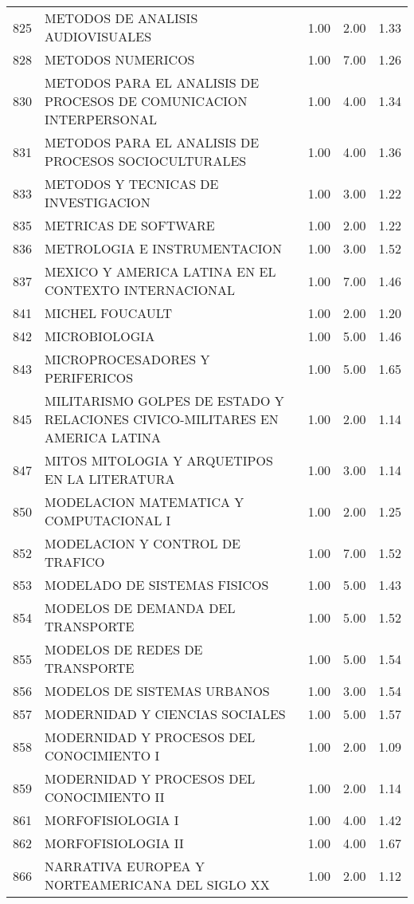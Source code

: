 \documentclass[12pt]{article}
\begin{document}
\begin{table}[ht]
\begin{tabular}{rlrrr}
  825 & METODOS DE ANALISIS AUDIOVISUALES & 1.00 & 2.00 & 1.33 \\ 
  828 & METODOS NUMERICOS & 1.00 & 7.00 & 1.26 \\ 
  830 & METODOS PARA EL ANALISIS DE PROCESOS DE COMUNICACION INTERPERSONAL & 1.00 & 4.00 & 1.34 \\ 
  831 & METODOS PARA EL ANALISIS DE PROCESOS SOCIOCULTURALES & 1.00 & 4.00 & 1.36 \\ 
  833 & METODOS Y TECNICAS DE INVESTIGACION & 1.00 & 3.00 & 1.22 \\ 
  835 & METRICAS DE SOFTWARE & 1.00 & 2.00 & 1.22 \\ 
  836 & METROLOGIA E INSTRUMENTACION & 1.00 & 3.00 & 1.52 \\ 
  837 & MEXICO Y AMERICA LATINA EN EL CONTEXTO INTERNACIONAL & 1.00 & 7.00 & 1.46 \\ 
  841 & MICHEL FOUCAULT & 1.00 & 2.00 & 1.20 \\ 
  842 & MICROBIOLOGIA & 1.00 & 5.00 & 1.46 \\ 
  843 & MICROPROCESADORES Y PERIFERICOS & 1.00 & 5.00 & 1.65 \\ 
  845 & MILITARISMO GOLPES DE ESTADO Y RELACIONES CIVICO-MILITARES EN AMERICA LATINA & 1.00 & 2.00 & 1.14 \\ 
  847 & MITOS MITOLOGIA Y ARQUETIPOS EN LA LITERATURA & 1.00 & 3.00 & 1.14 \\ 
  850 & MODELACION MATEMATICA Y COMPUTACIONAL I & 1.00 & 2.00 & 1.25 \\ 
  852 & MODELACION Y CONTROL DE TRAFICO & 1.00 & 7.00 & 1.52 \\ 
  853 & MODELADO DE SISTEMAS FISICOS & 1.00 & 5.00 & 1.43 \\ 
  854 & MODELOS DE DEMANDA DEL TRANSPORTE & 1.00 & 5.00 & 1.52 \\ 
  855 & MODELOS DE REDES DE TRANSPORTE & 1.00 & 5.00 & 1.54 \\ 
  856 & MODELOS DE SISTEMAS URBANOS & 1.00 & 3.00 & 1.54 \\ 
  857 & MODERNIDAD Y CIENCIAS SOCIALES & 1.00 & 5.00 & 1.57 \\ 
  858 & MODERNIDAD Y PROCESOS DEL CONOCIMIENTO I & 1.00 & 2.00 & 1.09 \\ 
  859 & MODERNIDAD Y PROCESOS DEL CONOCIMIENTO II & 1.00 & 2.00 & 1.14 \\ 
  861 & MORFOFISIOLOGIA I & 1.00 & 4.00 & 1.42 \\ 
  862 & MORFOFISIOLOGIA II & 1.00 & 4.00 & 1.67 \\ 
  866 & NARRATIVA EUROPEA Y NORTEAMERICANA DEL SIGLO XX & 1.00 & 2.00 & 1.12 \\ 

\end{tabular}
\end{table}
\end{document}

